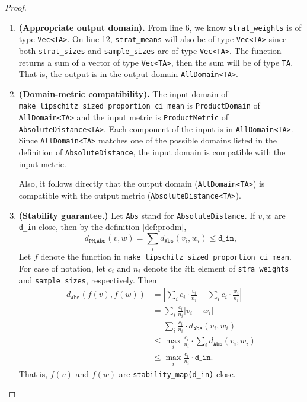 \documentclass[11pt,a4paper]{article}
\begin{document}
\begin{proof}
\hfill
\begin{enumerate}


    \item \textbf{(Appropriate output domain).} 
    From line 6, we know \texttt{strat\_weights} is of type \texttt{Vec<TA>}. On line 12, \texttt{strat\_means} will also be of type \texttt{Vec<TA>} since both \texttt{strat\_sizes} and \texttt{sample\_sizes} are of type \texttt{Vec<TA>}.
    The function returns a sum of a vector of type \texttt{Vec<TA>}, then the sum will be of type \texttt{TA}. That is, the output is in the output domain \texttt{AllDomain<TA>}.
    
    
    
    \smallskip
    \item \textbf{(Domain-metric compatibility).}
    The input domain of  \\
    \texttt{make\_lipschitz\_sized\_proportion\_ci\_mean} is \texttt{ProductDomain} of \texttt{AllDomain<TA>} and the input metric is \texttt{ProductMetric} of \texttt{AbsoluteDistance<TA>}.
    Each component of the input is in \texttt{AllDomain<TA>}.
    Since \texttt{AllDomain<TA>} matches one of the possible domains listed in the definition of \texttt{AbsoluteDistance}, 
    the input domain is compatible with the input metric.
    
    Also, it follows directly that the output domain (\texttt{AllDomain<TA>}) is compatible with the output metric (\texttt{AbsoluteDistance<TA>}). 
    
   
    
    \smallskip
    \item \textbf{(Stability guarantee.)} Let \texttt{Abs} stand for \texttt{AbsoluteDistance}.
    If $v, w$ are \texttt{d\_in}-close, then by the definition \ref{def:prodm},
    \begin{equation*}
        d_\texttt{PM,Abs}(v, w) = \sum_{i}d_\texttt{Abs}(v_i, w_i) \leq \texttt{d\_in},    
    \end{equation*}
    Let $f$ denote the function in \texttt{make\_lipschitz\_sized\_proportion\_ci\_mean}. For ease of notation, let $c_i$ and $n_i$ denote the $i$th element of \texttt{stra\_weights} and \texttt{sample\_sizes}, respectively. Then 
    \begin{equation*}
        \begin{aligned}
            d_\texttt{Abs}(f(v), f(w))  & = \left|\sum_{i} c_i \cdot \frac{v_i}{n_i} - \sum_{i} c_i \cdot \frac{w_i}{n_i} \right| \\
            & = \sum_{i} \frac{c_i}{n_i} \left| v_i - w_i \right| \\
            & = \sum_{i} \frac{c_i}{n_i} \cdot d_\texttt{Abs}(v_i, w_i) \\
            & \leq \max_i \frac{c_i}{n_i} \cdot
            \sum_{i}  d_\texttt{Abs}(v_i, w_i)\\
            & \leq \max_i \frac{c_i}{n_i} \cdot
            \texttt{d\_in}.
        \end{aligned}
    \end{equation*}
    That is, $f(v)$ and $f(w)$ are \texttt{stability\_map(d\_in)}-close.  
    

\end{enumerate}
\end{proof}
\end{document}
